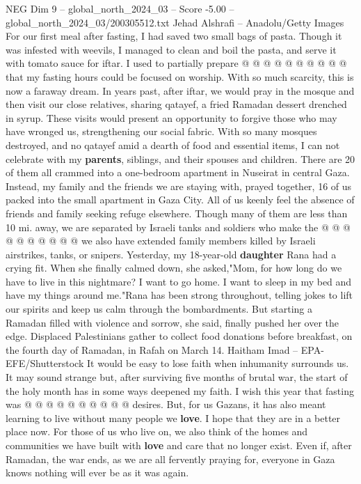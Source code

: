 \begin{textsample}{NEG Dim 9 – global\_north\_2024\_03 – Score -5.00 – global\_north\_2024\_03/200305512.txt}
Jehad Alshrafi -- Anadolu/Getty Images For our first meal after fasting, I had saved two small bags of pasta.
Though it was infested with weevils, I managed to clean and boil the pasta, and serve it with tomato sauce for iftar.
I used to partially prepare @ @ @ @ @ @ @ @ @ @ that my fasting hours could be focused on worship.
With so much scarcity, this is now a faraway dream.
In years past, after iftar, we would pray in the mosque and then visit our close relatives, sharing qatayef, a fried Ramadan dessert drenched in syrup.
These visits would present an opportunity to forgive those who may have wronged us, strengthening our social fabric.
With so many mosques destroyed, and no qatayef amid a dearth of food and essential items, I can not celebrate with my \textbf{parents}, siblings, and their spouses and children.
There are 20 of them all crammed into a one-bedroom apartment in Nuseirat in central Gaza.
Instead, my family and the friends we are staying with, prayed together, 16 of us packed into the small apartment in Gaza City.
All of us keenly feel the absence of friends and family seeking refuge elsewhere.
Though many of them are less than 10 mi. away, we are separated by Israeli tanks and soldiers who make the @ @ @ @ @ @ @ @ @ @ we also have extended family members killed by Israeli airstrikes, tanks, or snipers.
Yesterday, my 18-year-old \textbf{daughter} Rana had a crying fit.
When she finally calmed down, she asked,"Mom, for how long do we have to live in this nightmare?
I want to go home.
I want to sleep in my bed and have my things around me."Rana has been strong throughout, telling jokes to lift our spirits and keep us calm through the bombardments.
But starting a Ramadan filled with violence and sorrow, she said, finally pushed her over the edge.
Displaced Palestinians gather to collect food donations before breakfast, on the fourth day of Ramadan, in Rafah on March 14.
Haitham Imad -- EPA-EFE/Shutterstock It would be easy to lose faith when inhumanity surrounds us.
It may sound strange but, after surviving five months of brutal war, the start of the holy month has in some ways deepened my faith.
I wish this year that fasting was @ @ @ @ @ @ @ @ @ @ desires.
But, for us Gazans, it has also meant learning to live without many people we \textbf{love}.
I hope that they are in a better place now.
For those of us who live on, we also think of the homes and communities we have built with \textbf{love} and care that no longer exist.
Even if, after Ramadan, the war ends, as we are all fervently praying for, everyone in Gaza knows nothing will ever be as it was again.

\end{textsample}
